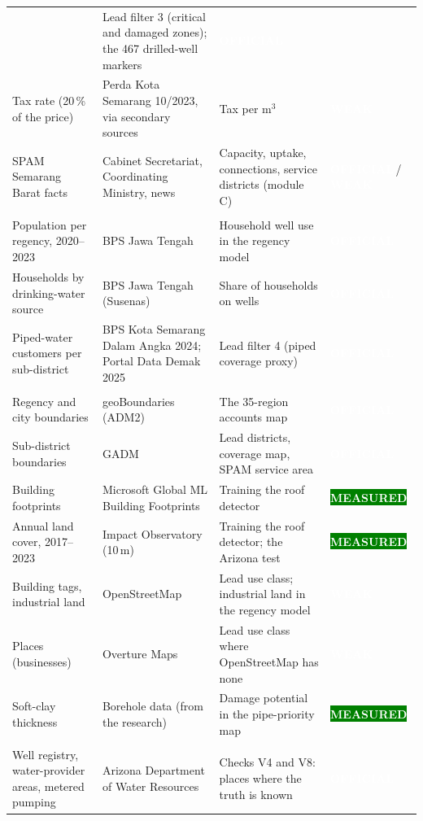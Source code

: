 \documentclass[11pt,a4paper]{article}
\newcommand{\pv}[2]{{\setlength{\fboxsep}{1.3pt}\colorbox{#1}{\textcolor{white}{\sffamily\bfseries\fontsize{6.3}{7}\selectfont #2}}}}
\newcommand{\Off}{\pv{accent}{OFFICIAL}}
\newcommand{\Mea}{\pv{green}{MEASURED}}
\newcommand{\Wk}{\pv{weak}{WEAK}}
\newcommand{\mthree}{m$^{3}$}
\begin{document}
{\begin{xltabular}{\linewidth}{@{}L{38mm}L{36mm}Y l@{}}
  & Lead filter 3 (critical and damaged zones); the 467 drilled-well markers & \Off\\
Tax rate (20\,\% of the price) & Perda Kota Semarang 10/2023, via secondary sources & Tax per \mthree &
  \Wk\\
SPAM Semarang Barat facts & Cabinet Secretariat, Coordinating Ministry, news & Capacity, uptake,
  connections, service districts (module C) & \Off\,/\,\Wk\\
\addlinespace
{}\\
Population per regency, 2020--2023 & BPS Jawa Tengah & Household well use in the regency model & \Off\\
Households by drinking-water source & BPS Jawa Tengah (Susenas) & Share of households on wells & \Off\\
Piped-water customers per sub-district & BPS Kota Semarang Dalam Angka 2024; Portal Data Demak 2025 &
  Lead filter 4 (piped coverage proxy) & \Off\\
\addlinespace
{}\\
Regency and city boundaries & geoBoundaries (ADM2) & The 35-region accounts map & \Off\\
Sub-district boundaries & GADM & Lead districts, coverage map, SPAM service area & \Off\\
Building footprints & Microsoft Global ML Building Footprints & Training the roof detector & \Mea\\
Annual land cover, 2017--2023 & Impact Observatory (10\,m) & Training the roof detector; the Arizona
  test & \Mea\\
Building tags, industrial land & OpenStreetMap & Lead use class; industrial land in the regency model &
  \Wk\\
Places (businesses) & Overture Maps & Lead use class where OpenStreetMap has none & \Wk\\
Soft-clay thickness & Borehole data (from the research) & Damage potential in the pipe-priority map &
  \Mea\\
\addlinespace
{}\\
Well registry, water-provider areas, metered pumping & Arizona Department of Water Resources & Checks V4
  and V8: places where the truth is known & \Off\\
\bottomrule
\end{xltabular}}
\end{document}
